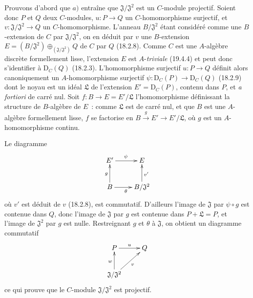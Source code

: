 \begin{env}[19.5.4.1]
\label{0.19.5.4.1-fr}
Prouvons d'abord que $a)$ entraîne que $\mathfrak J/\mathfrak J^2$ est un
$C$-module projectif. Soient donc $P$ et $Q$ deux $C$-modules,
$u:P\to Q$ un $C$-homomorphisme surjectif, et
$v:\mathfrak J/\mathfrak J^2\to Q$ un $C$-homomorphisme. L'anneau
$B/\mathfrak J^2$ étant considéré comme une $B$-extension de $C$ par
$\mathfrak J/\mathfrak J^2$, on en déduit par $v$ une $B$-extension
$E=(B/\mathfrak J^2)\oplus_{(\mathfrak J/\mathfrak J^2)}Q$ de $C$ par $Q$
(18.2.8). Comme $C$ est une $A$-algèbre discrète formellement lisse,
l'extension $E$ est $A$-\emph{triviale} (19.4.4) et peut donc s'identifier à
$\mathrm D_C(Q)$ (18.2.3). L'homomorphisme surjectif $u:P\to Q$ définit alors
canoniquement un $A$-homomorphisme surjectif
$\psi:\mathrm D_C(P)\to\mathrm D_C(Q)$ (18.2.9) dont le noyau est un idéal
$\mathfrak L$ de l'extension $E'=\mathrm D_C(P)$, contenu dans $P$, et
\emph{a fortiori} de carré nul. Soit $f:B\to E=E'/\mathfrak L$
l'homomorphisme définissant la structure de $B$-algèbre de $E$~: comme
$\mathfrak L$ est de carré nul, et que $B$ est une $A$-algèbre formellement
lisse, $f$ se factorise en $B\xrightarrow{g}E'\to E'/\mathfrak L$, où $g$ est
un $A$-homomorphisme continu.


Le diagramme
\[
  \xymatrix{
    E' \ar[r]^{\psi} & E \\
    B \ar[u]^{g} \ar[r]_{\theta} & B/\mathfrak J^2 \ar[u]_{v'}
  }
\]
où $v'$ est déduit de $v$ (18.2.8), est commutatif. D'ailleurs l'image de
$\mathfrak J$ par $\psi\circ g$ est contenue dans $Q$, donc l'image de
$\mathfrak J$ par $g$ est contenue dans $P+\mathfrak L=P$, et l'image de
$\mathfrak J^2$ par $g$ est nulle. Restreignant $g$ et $\theta$ à
$\mathfrak J$, on obtient un diagramme commutatif
\[
  \xymatrix{
    P \ar[r]^{u} & Q \\
    \mathfrak J/\mathfrak J^2 \ar[u]^{w} \ar[ur]_{v}
  }
\]
ce qui prouve que le $C$-module $\mathfrak J/\mathfrak J^2$ est projectif.
\end{env}

